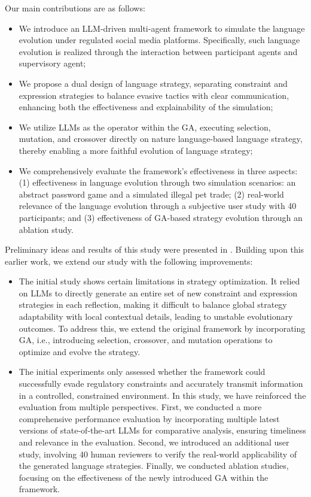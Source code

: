 Our main contributions are as follows:
\begin{itemize}
    \item We introduce an LLM-driven multi-agent framework to simulate the language evolution under regulated social media platforms. Specifically, such language evolution is realized through the interaction between participant agents and supervisory agent;
    \item We propose a dual design of language strategy, separating constraint and expression strategies to balance evasive tactics with clear communication, enhancing both the effectiveness and explainability of the simulation;
    \item We utilize LLMs as the operator within the GA, executing selection, mutation, and crossover directly on nature language-based language strategy, thereby enabling a more faithful evolution of language strategy;
    \item We comprehensively evaluate the framework’s effectiveness in three aspects: (1) effectiveness in language evolution through two simulation scenarios: an abstract password game and a simulated illegal pet trade; (2) real-world relevance of the language evolution through a subjective user study with 40 participants; and (3) effectiveness of GA-based strategy evolution through an ablation study.
\end{itemize}


Preliminary ideas and results of this study were presented in \cite{DBLP:conf/cec/CaiLZLWT24}. Building upon this earlier work, we extend our study with the following improvements:
\begin{itemize}
    \item The initial study shows certain limitations in strategy optimization. It relied on LLMs to directly generate an entire set of new constraint and expression strategies in each reflection, making it difficult to balance global strategy adaptability with local contextual details, leading to unstable evolutionary outcomes. To address this, we extend the original framework by incorporating GA, i.e., introducing selection, crossover, and mutation operations to optimize and evolve the strategy. 
    
    \item The initial experiments only assessed whether the framework could successfully evade regulatory constraints and accurately transmit information in a controlled, constrained environment. In this study, we have reinforced the evaluation from multiple perspectives. First, we conducted a more comprehensive performance evaluation by incorporating multiple latest versions of state-of-the-art LLMs for comparative analysis, ensuring timeliness and relevance in the evaluation. Second, we introduced an additional user study, involving 40 human reviewers to verify the real-world applicability of the generated language strategies. Finally, we conducted ablation studies, focusing on the effectiveness of the newly introduced GA within the framework. 
\end{itemize}

